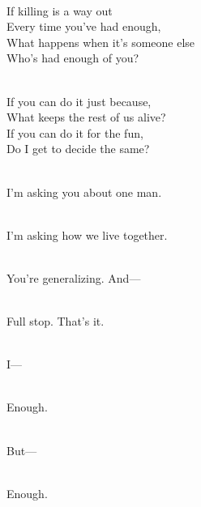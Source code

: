 \begin{lyrics}
\\
If killing is a way out\\
Every time you’ve had enough,\\
What happens when it’s someone else\\
Who’s had enough of you?

\\
If you can do it just because,\\
What keeps the rest of us alive?\\
If you can do it for the fun,\\
Do I get to decide the same?

\\
I’m asking you about one man.

\\
I’m asking how we live together.


\\
You’re generalizing. And—

\\
Full stop. That’s it.

\\
I—

\\
Enough.

\\
But—

\\
Enough.

\end{lyrics}

